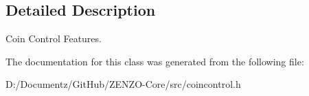 \subsection{Detailed Description}
Coin Control Features. 

The documentation for this class was generated from the following file\+:\begin{DoxyCompactItemize}
\item 
D\+:/\+Documentz/\+Git\+Hub/\+Z\+E\+N\+Z\+O-\/\+Core/src/coincontrol.\+h\end{DoxyCompactItemize}

